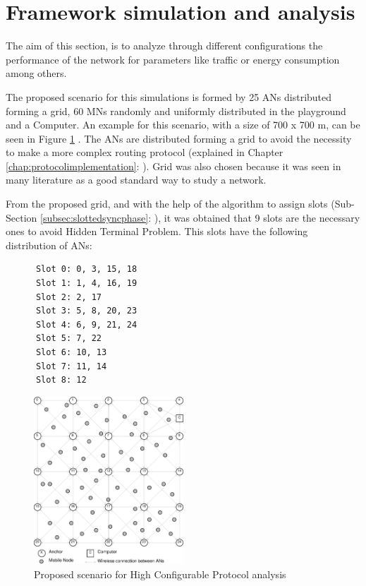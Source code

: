 \section{Framework simulation and analysis}

The aim of this section, is to analyze through different configurations the performance of the network for parameters like traffic or energy 
consumption among others.

The proposed scenario for this simulations is formed by 25 \acp{AN} distributed forming a grid, 60 \acp{MN} randomly and uniformly distributed in the
playground and a Computer. An example for this scenario, with a size of 700 x 700 m, can be seen in Figure \ref{fig:finalscenario} . The \acp{AN} 
are distributed forming a grid to avoid the necessity to make a more complex routing protocol (explained in Chapter \ref{chap:protocolimplementation}: 
). Grid was also chosen because it was seen in many literature as a good standard way to study a network.

From the proposed grid, and with the help of the algorithm to assign slots (Sub-Section \ref{subsec:slottedsyncphase}: 
), it was obtained that 9 slots are the necessary ones to avoid Hidden Terminal Problem. This slots have the 
following distribution of \acp{AN}:

\begin{verbatim}
      Slot 0: 0, 3, 15, 18
      Slot 1: 1, 4, 16, 19
      Slot 2: 2, 17
      Slot 3: 5, 8, 20, 23
      Slot 4: 6, 9, 21, 24
      Slot 5: 7, 22
      Slot 6: 10, 13
      Slot 7: 11, 14
      Slot 8: 12
\end{verbatim}

\begin{figure}[ht]
 \begin{center}
  \includegraphics[width=0.5\textwidth]{finalscenario.eps}
 \end{center}
 \caption{Proposed scenario for High Configurable Protocol analysis}
 \label{fig:finalscenario}
\end{figure}

